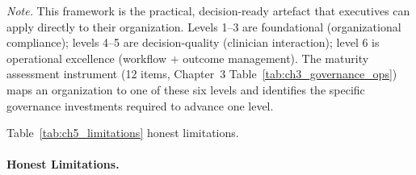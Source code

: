 \vspace{0.4em}
\noindent\textit{Note.} This framework is the practical, decision-ready artefact that executives can apply directly to their organization. Levels 1--3 are foundational (organizational compliance); levels 4--5 are decision-quality (clinician interaction); level 6 is operational excellence (workflow + outcome management). The maturity assessment instrument (12 items, Chapter~3 Table~\ref{tab:ch3_governance_ops}) maps an organization to one of these six levels and identifies the specific governance investments required to advance one level.

\noindent Table~\ref{tab:ch5_limitations} honest limitations.

\paragraph{Honest Limitations.}




